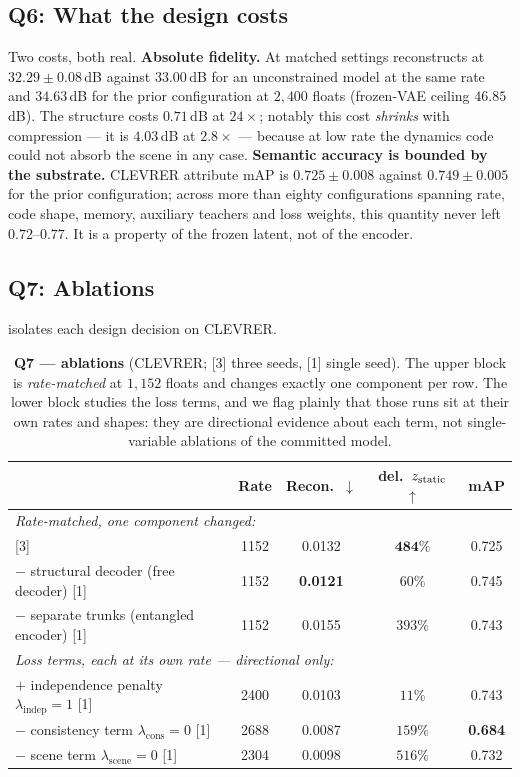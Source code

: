 \subsection{Q6: What the design costs}
\label{sec:q5}
Two costs, both real. \textbf{Absolute fidelity.} At matched settings \method{}
reconstructs at $32.29\pm0.08$\,dB against $33.00$\,dB for an unconstrained model at the
same rate and $34.63$\,dB for the prior configuration at $2{,}400$ floats (frozen-VAE
ceiling $46.85$\,dB). The structure costs $0.71$\,dB at $24\times$; notably this cost
\emph{shrinks} with compression --- it is $4.03$\,dB at $2.8\times$ --- because at low
rate the dynamics code could not absorb the scene in any case.
\textbf{Semantic accuracy is bounded by the substrate.} CLEVRER attribute mAP is
$0.725\pm0.008$ against $0.749\pm0.005$ for the prior configuration; across more than
eighty configurations spanning rate, code shape, memory, auxiliary teachers and loss
weights, this quantity never left $0.72$--$0.77$. It is a property of the frozen latent,
not of the encoder.

\subsection{Q7: Ablations}
\label{sec:q6}
 isolates each design decision on CLEVRER.

\begin{table}[t]
\centering\small
\caption{\textbf{Q7 --- ablations} (CLEVRER; [3] three seeds, [1] single seed). The upper
block is \emph{rate-matched} at $1{,}152$ floats and changes exactly one component per
row. The lower block studies the loss terms, and we flag plainly that those runs sit at
their own rates and shapes: they are directional evidence about each term, not
single-variable ablations of the committed model.}
\label{tab:ablations}
\begin{tabular}{lcccc}
\toprule
& Rate & Recon.\ $\downarrow$ & del.\ $z_{\mathrm{static}}$ $\uparrow$ & mAP \\
\midrule
\multicolumn{5}{l}{\emph{Rate-matched, one component changed:}} \\
\textbf{\method{}} [3] & 1152 & 0.0132 & $\mathbf{484\%}$ & 0.725 \\
$-$ structural decoder (free decoder) [1] & 1152 & \textbf{0.0121} & $60\%$ & 0.745 \\
$-$ separate trunks (entangled encoder) [1] & 1152 & 0.0155 & $393\%$ & 0.743 \\
\midrule
\multicolumn{5}{l}{\emph{Loss terms, each at its own rate --- directional only:}} \\
$+$ independence penalty $\lambda_{\mathrm{indep}}{=}1$ [1] & 2400 & 0.0103 & $11\%$ & 0.743 \\
$-$ consistency term $\lambda_{\mathrm{cons}}{=}0$ [1] & 2688 & 0.0087 & $159\%$ & \textbf{0.684} \\
$-$ scene term $\lambda_{\mathrm{scene}}{=}0$ [1] & 2304 & 0.0098 & $516\%$ & 0.732 \\
\bottomrule
\end{tabular}
\end{table}

